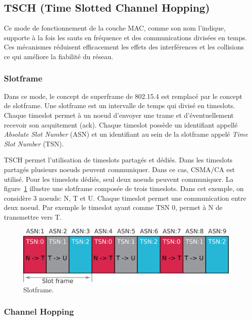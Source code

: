\subsection{TSCH (Time Slotted Channel Hopping)}\label{subsec:etat_art-802.15.4.tsch}

Ce mode de fonctionnement de la couche MAC, comme son nom l'indique, supporte à la fois les sauts en fréquence et des communications divisées en temps. Ces mécanismes réduisent efficacement les effets des interférences et les collisions ce qui améliore la fiabilité du réseau.

\subsubsection*{Slotframe}
Dans ce mode, le concept de superframe de 802.15.4 est remplacé par le concept de slotframe.
Une slotframe est un intervalle de temps qui divisé en timeslots. Chaque timeslot permet à un noeud d'envoyer une trame et d'éventuellement recevoir son acquitement (ack).
Chaque timeslot possède un identifiant appellé \textit{Absolute Slot Number} (ASN)
et un identifiant au sein de la slotframe appelé \textit{Time Slot Number} (TSN).

TSCH permet l'utilisation de timeslots partagés et dédiés. Dans les timeslots partagés plusieurs noeuds peuvent communiquer. Dans ce cas, CSMA/CA est utilisé. Pour les timeslots dédiés, seul deux noeuds peuvent communiquer. La figure~\ref{fig:state-slotframe} illustre une slotframe composée de trois timeslots.
Dans cet exemple, on considère 3 noeuds: N, T et U. Chaque timeslot permet une communication entre deux noeud.
Par exemple le timeslot ayant comme TSN 0, permet à N de transmettre vers T.

\begin{figure}[H]
  \centering
  \includegraphics[scale=0.7]{res/pictures/sloframe.png}
  \caption{Slotframe.}
  \label{fig:state-slotframe}
\end{figure}

\subsubsection*{Channel Hopping}


